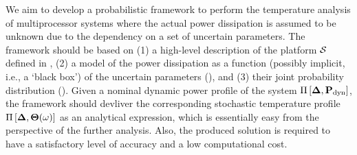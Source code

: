 We aim to develop a probabilistic framework to perform the temperature analysis of multiprocessor systems where the actual power dissipation is assumed to be unknown due to the dependency on a set of uncertain parameters. The framework should be based on (1) a high-level description of the platform $\mathcal{S}$ defined in , (2) a model of the power dissipation as a function (possibly implicit, i.e., a `black box') of the uncertain parameters (), and (3) their joint probability distribution (). Given a nominal dynamic power profile of the system $\prof{\mP_\dyn}$, the framework should devliver the corresponding stochastic temperature profile $\Pi\left[\boldsymbol{\Delta}, {\boldsymbol\Theta}(\omega)\right]$ as an analytical expression, which is essentially easy from the perspective of the further analysis. Also, the produced solution is required to have a satisfactory level of accuracy and a low computational cost.
